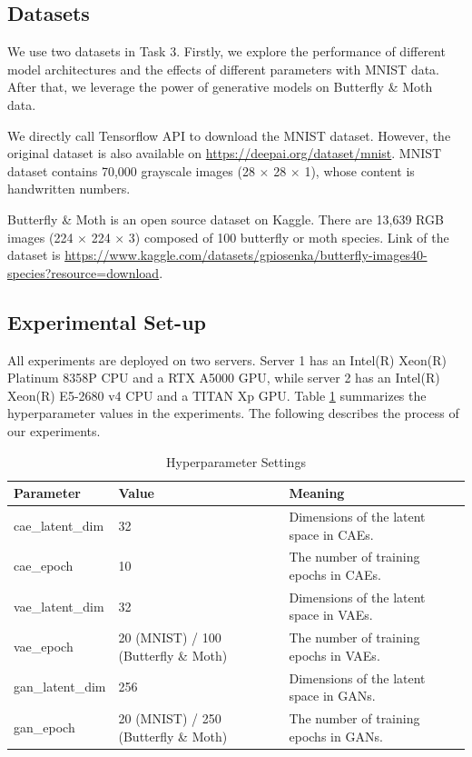 \documentclass{article}
\begin{document}
\subsection{Datasets}
We use two datasets in Task 3. Firstly, we explore the performance of different model architectures and the effects of different parameters with MNIST data. After that, we leverage the power of generative models on Butterfly \& Moth data. \par
We directly call Tensorflow API to download the MNIST dataset. However, the original dataset is also available on \url{https://deepai.org/dataset/mnist}. MNIST dataset contains 70,000 grayscale images (28 $\times$ 28 $\times$ 1), whose content is handwritten numbers. \par
Butterfly \& Moth is an open source dataset on Kaggle. There are 13,639 RGB images (224 $\times$ 224 $\times$ 3) composed of 100 butterfly or moth species. Link of the dataset is \url{https://www.kaggle.com/datasets/gpiosenka/butterfly-images40-species?resource=download}.

\subsection{Experimental Set-up}
All experiments are deployed on two servers. Server 1 has an Intel(R) Xeon(R) Platinum 8358P CPU and a RTX A5000 GPU, while server 2 has an Intel(R) Xeon(R) E5-2680 v4 CPU and a TITAN Xp GPU. Table \ref{tab:3-hyper} summarizes the hyperparameter values in the experiments. The following describes the process of our experiments.
\begin{table}[!ht]
    \centering
    \caption{Hyperparameter Settings}
    \label{tab:3-hyper}
    \begin{tabular}{lll}
        \toprule
        \textbf{Parameter} & \textbf{Value} & \textbf{Meaning}\\
        \midrule
        cae\_latent\_dim & 32 & Dimensions of the latent space in CAEs.\\
        cae\_epoch & 10 & The number of training epochs in CAEs.\\
        vae\_latent\_dim & 32 & Dimensions of the latent space in VAEs.\\
        vae\_epoch & 20 (MNIST) / 100 (Butterfly \& Moth) & The number of training epochs in VAEs.\\
        gan\_latent\_dim & 256 & Dimensions of the latent space in GANs.\\
        gan\_epoch & 20 (MNIST) / 250 (Butterfly \& Moth) & The number of training epochs in GANs.\\
        \bottomrule
    \end{tabular}
\end{table}
\end{document}
